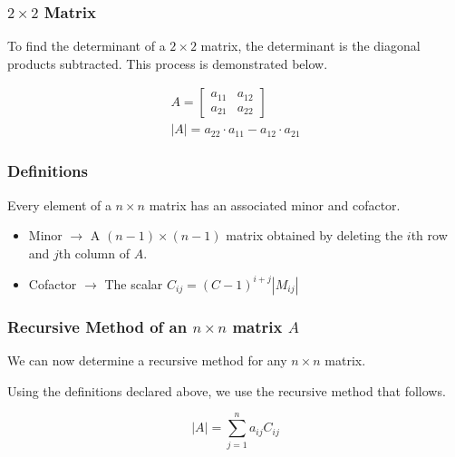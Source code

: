 \documentclass[12pt, landscape, twocolumn]{article}
\begin{document}
        \subsubsection{$2 \times 2$ Matrix}\label{subsubsec:22mat}
        To find the determinant of a $2 \times 2$ matrix, the determinant is the diagonal products subtracted. This process is demonstrated below.

        \begin{equation}\label{eq:22det}
        \begin{aligned}
            A =
            \left[\begin{array}{cc}
                a_{11} & a_{12}\\
                a_{21} & a_{22}
            \end{array}\right]\\
            \left| A \right| = a_{22} \cdot a_{11} - a_{12} \cdot a_{21}
        \end{aligned}
        \end{equation}

        \subsubsection{Definitions}
        Every element of a $n \times n$ matrix has an associated minor and cofactor.

        \begin{itemize}
        \item Minor $\to$ A $(n - 1) \times (n - 1)$ matrix obtained by deleting the $i$th row and $j$th column of $A$.
        \item Cofactor $\to$ The scalar $C_{ij} = (C - 1)^{i+j} \left| M_{ij} \right|$
        \end{itemize}

        \subsubsection{Recursive Method of an $n \times n$ matrix $A$}
        We can now determine a recursive method for any $n \times n$ matrix.

        Using the definitions declared above, we use the recursive method that follows.

        \begin{equation}\label{eq:detrec}
        \left| A \right| = \sum_{j=1}^n a_{ij} C_{ij}
        \end{equation}
\end{document}
